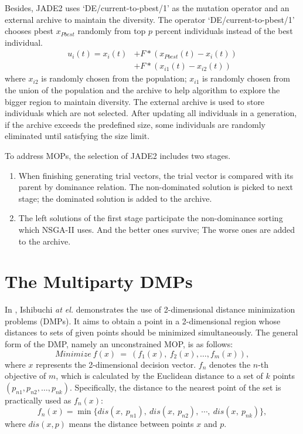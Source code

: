 \documentclass[preprint,12pt]{elsarticle}
\begin{document}
Besides, JADE2 uses `DE/current-to-pbest/1' as the mutation operator and an external archive to maintain the diversity.
The operator `DE/current-to-pbest/1' chooses pbest $x_{Pbest}$ randomly from top $p$ percent individuals instead of the best individual.
\begin{equation} \label{eq:DE}
	\begin{aligned}
		u_i(t) = x_i(t) & + F * (x_{Pbest}(t) - x_i(t)) \\
		                & + F * (x_{i1}(t) - x_{i2}(t))
	\end{aligned}
\end{equation}
where $x_{i2}$ is randomly chosen from the population;
$x_{i1}$ is randomly chosen from the union of the population and the archive to help algorithm to explore the bigger region to maintain diversity.
The external archive is used to store individuals which are not selected.
After updating all individuals in a generation, if the archive exceeds the predefined size, some individuals are randomly eliminated until satisfying the size limit.

To address MOPs, the selection of JADE2 includes two stages.
\begin{enumerate}[(1)]
	\item When finishing generating trial vectors, the trial vector is compared with its parent by dominance relation.
	      The non-dominated solution is picked to next stage; the dominated solution is added to the archive.
	\item The left solutions of the first stage participate the non-dominance sorting which NSGA-II uses. And the better ones survive; The worse ones are added to the archive. 
\end{enumerate}

\section{The Multiparty DMPs}\label{sec:the-multiparty-multiobjective-test-problem}

In \cite{Ishibuchi2010}, Ishibuchi \textit{at el.} demonstrates the use of 2-dimensional distance minimization problems (DMPs).
It aims to obtain a point in a 2-dimensional region whose distances to sets of given points should be minimized simultaneously.
The general form of the DMP, namely an unconstrained MOP, is as follows:
\begin{equation}\label{eq2}
	Minimize\ f(x)\ =\ (f_1(x),\ f_2(x),\dots,f_m(x)),
\end{equation}
where $x$ represents the 2-dimensional decision vector.
$f_n$ denotes the $n$-th objective of $m$, which is calculated by the Euclidean distance to a set of $k$ points $(p_{n1}, p_{n2},\dots, p_{nk})$.
Specifically, the distance to the nearest point of the set is practically used as $f_n(x)$:
\begin{equation}\label{eq3}
	f_n(x)= \min \{dis(x,\ p_{n1}),\ dis(x,\ p_{n2}),\ \cdots,\ dis(x,\ p_{nk})\},
\end{equation}
where $dis(x, p)$ means the distance between points $x$ and $p$.
\end{document}
